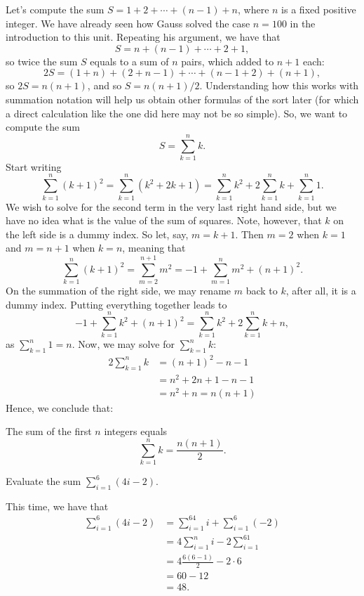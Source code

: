 \documentclass[nooutcomes]{ximera}
\begin{document}
Let's compute the sum $S = 1+2+\cdots +(n-1)+ n$, where $n$ is a fixed positive integer. We have already seen how Gauss solved the case $n=100$ in the introduction to this unit. Repeating his argument, we have that $$S = n + (n-1)+\cdots +2+1,$$so twice the sum $S$ equals to a sum of $n$ pairs, which added to $n+1$ each: $$2S = (1+n) + (2+n-1)+\cdots + (n-1+2) + (n+1),$$so $2S = n(n+1)$, and so $S = n(n+1)/2$. Understanding how this works with summation notation will help us obtain other formulas of the sort later (for which a direct calculation like the one did here may not be so simple). So, we want to compute the sum $$S = \sum_{k=1}^n k.$$Start writing$$\sum_{k=1}^n (k+1)^2 = \sum_{k=1}^n (k^2 + 2k+1) = \sum_{k=1}^n k^2 + 2\sum_{k=1}^n k + \sum_{k=1}^n 1.$$We wish to solve for the second term in the very last right hand side, but we have no idea what is the value of the sum of squares. Note, however, that $k$ on the left side is a dummy index. So let, say, $m=k+1$. Then $m=2$ when $k=1$ and $m=n+1$ when $k=n$, meaning that $$\sum_{k=1}^n(k+1)^2 = \sum_{m=2}^{n+1} m^2 = -1 + \sum_{m=1}^n m^2 + (n+1)^2.$$On the summation of the right side, we may rename $m$ back to $k$, after all, it is a dummy index. Putting everything together leads to $$-1+\sum_{k=1}^nk^2+(n+1)^2 = \sum_{k=1}^n k^2+2\sum_{k=1}^nk+n,$$as $\sum_{k=1}^n 1=n$. Now, we may solve for $\sum_{k=1}^nk$:
\begin{align*} 2\sum_{k=1}^nk &= (n+1)^2-n-1 \\ &= n^2+2n+1-n-1 \\ &= n^2+n =n(n+1)\end{align*}Hence, we conclude that:
\begin{callout}
The sum of the first $n$ integers equals $$\sum_{k=1}^n k = \frac{n(n+1)}{2}.$$  
\end{callout}

\begin{example}
  Evaluate the sum $\sum_{i=1}^6 (4i-2)$.

  \begin{explanation}
  This time, we have that
  \begin{align*}
    \sum_{i=1}^6 (4i-2) &= \sum_{i=1}^64i + \sum_{i=1}^6(-2) \\ &= 4\sum_{i=1}^ni - 2\sum_{i=1}^61 \\ &= 4\frac{6(6-1)}{2} - 2\cdot 6 \\ &= 60-12 \\ &= 48.
  \end{align*}
  \end{explanation}
\end{example}
\end{document}

